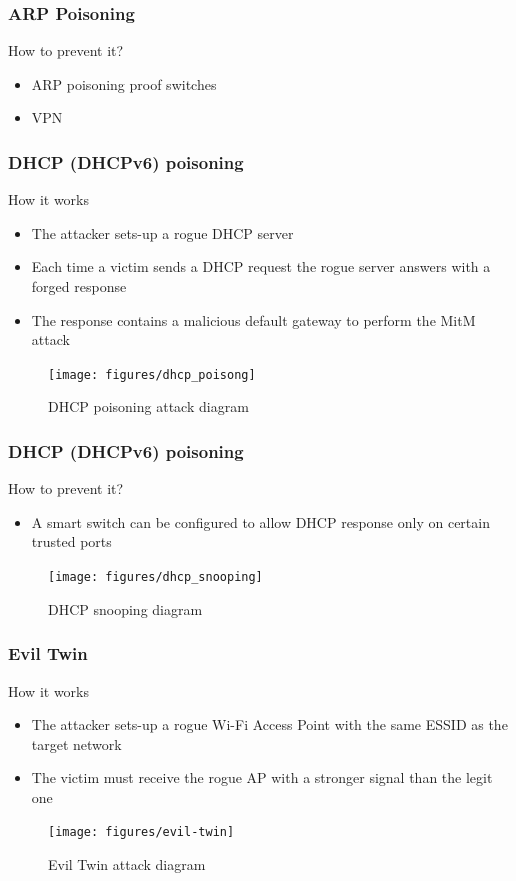 \documentclass{beamer}
\begin{document}
\begin{frame}
  \frametitle{ARP Poisoning}
  \begin{block}{How to prevent it?}
  \pause
  \begin{itemize}
    \item ARP poisoning proof switches
    \item VPN
  \end{itemize}
\end{block}
\end{frame}
\begin{frame}
  \frametitle{DHCP (DHCPv6) poisoning}
  \begin{block}{How it works}
  \begin{itemize}
    \item The attacker sets-up a rogue DHCP server
    \item Each time a victim sends a DHCP request the rogue server answers with a forged response
    \item The response contains a malicious default gateway to perform the MitM attack
  \end{itemize}
\end{block}
  \begin{figure}
  \texttt{[image: figures/dhcp\_poisong]}
  \caption*{DHCP poisoning attack diagram}
  \end{figure}
\end{frame}


\begin{frame}
  \frametitle{DHCP (DHCPv6) poisoning}
  \begin{block}{How to prevent it?}
  \pause
  \begin{itemize}
    \item A smart switch can be configured to allow DHCP response only on certain trusted ports
  \end{itemize}
\end{block}
  \begin{figure}
  \texttt{[image: figures/dhcp\_snooping]}
  \caption*{DHCP snooping diagram}
  \end{figure}
\end{frame}


\begin{frame}
  \frametitle{Evil Twin}
  \begin{block}{How it works}
  \begin{itemize}
    \item The attacker sets-up a rogue Wi-Fi Access Point with the same ESSID as the target network
    \item The victim must receive the rogue AP with a stronger signal than the legit one
  \end{itemize}
\end{block}
  \begin{figure}
    \texttt{[image: figures/evil-twin]}
    \caption*{Evil Twin attack diagram}
  \end{figure}
\end{frame}
\end{document}
